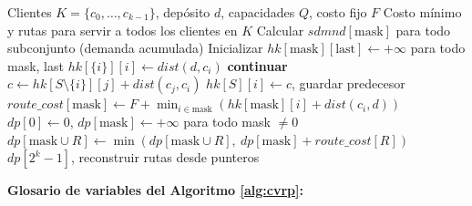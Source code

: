 \documentclass[12pt,a4paper]{article}
\begin{document}
\begin{algorithm}[H]
\caption{CVRP-Exacto (Held-Karp + Set-Cover DP)}
\label{alg:cvrp}
\begin{algorithmic}[1]
\Require Clientes $K = \{c_0, \ldots, c_{k-1}\}$, depósito $d$, capacidades $Q$, costo fijo $F$
\Ensure Costo mínimo y rutas para servir a todos los clientes en $K$
\State Calcular $sdmnd[\text{mask}]$ para todo subconjunto (demanda acumulada)     
\State Inicializar $hk[\text{mask}][\text{last}] \gets +\infty$ para todo mask, last 
    \State $hk[\{i\}][i] \gets dist(d, c_i)$                                     
\EndFor
{}                                          
     \textbf{continuar} \EndIf                                {}
                                                                   
                                                  
            \State $c \gets hk[S \setminus \{i\}][j] + dist(c_j, c_i)$
             $hk[S][i] \gets c$, guardar predecesor \EndIf
        \EndFor
    \EndFor
\EndFor
{}                                   
    \State $route\_cost[\text{mask}] \gets F + \min_{i \in \text{mask}}(hk[\text{mask}][i] + dist(c_i, d))$
\EndFor
\State $dp[0] \gets 0$, $dp[\text{mask}] \gets +\infty$ para todo mask $\neq 0$  
            \State $dp[\text{mask} \cup R] \gets \min(dp[\text{mask} \cup R],\ dp[\text{mask}] + route\_cost[R])$
        \EndIf
    \EndFor
\EndFor
\State \Return $dp[2^k - 1]$, reconstruir rutas desde punteros
\end{algorithmic}
\end{algorithm}

\textbf{Glosario de variables del Algoritmo \ref{alg:cvrp}:}
\end{document}

